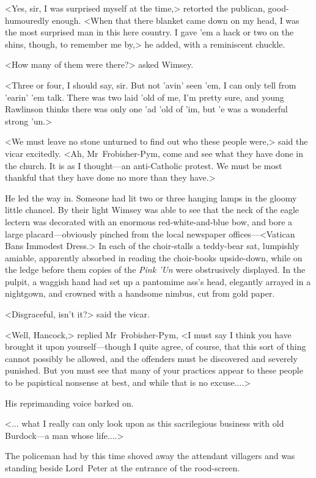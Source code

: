 <Yes, sir, I was surprised myself at the time,> retorted the publican, good-humouredly enough. <When that there blanket came down on my head, I was the most surprised man in this here country. I gave 'em a hack or two on the shins, though, to remember me by,> he added, with a reminiscent chuckle.

<How many of them were there?> asked Wimsey.

<Three or four, I should say, sir. But not 'avin' seen 'em, I can only tell from 'earin' 'em talk. There was two laid 'old of me, I'm pretty sure, and young Rawlinson thinks there was only one 'ad 'old of 'im, but 'e was a wonderful strong 'un.>

<We must leave no stone unturned to find out who these people were,> said the vicar excitedly. <Ah, Mr~Frobisher-Pym, come and see what they have done in the church. It is as I thought—an anti-Catholic protest. We must be most thankful that they have done no more than they have.>

He led the way in. Someone had lit two or three hanging lamps in the gloomy little chancel. By their light Wimsey was able to see that the neck of the eagle lectern was decorated with an enormous red-white-and-blue bow, and bore a large placard—obviously pinched from the local newspaper offices—<Vatican Bans Immodest Dress.> In each of the choir-stalls a teddy-bear sat, lumpishly amiable, apparently absorbed in reading the choir-books upside-down, while on the ledge before them copies of the \textit{Pink 'Un} were obstrusively displayed. In the pulpit, a waggish hand had set up a pantomime ass's head, elegantly arrayed in a nightgown, and crowned with a handsome nimbus, cut from gold paper.

<Disgraceful, isn't it?> said the vicar.

<Well, Hancock,> replied Mr~Frobisher-Pym, <I must say I think you have brought it upon yourself—though I quite agree, of course, that this sort of thing cannot possibly be allowed, and the offenders must be discovered and severely punished. But you must see that many of your practices appear to these people to be papistical nonsense at best, and while that is no excuse....>

His reprimanding voice barked on.

<... what I really can only look upon as this sacrilegious business with old Burdock—a man whose life....>

The policeman had by this time shoved away the attendant villagers and was standing beside Lord~Peter at the entrance of the rood-screen.

